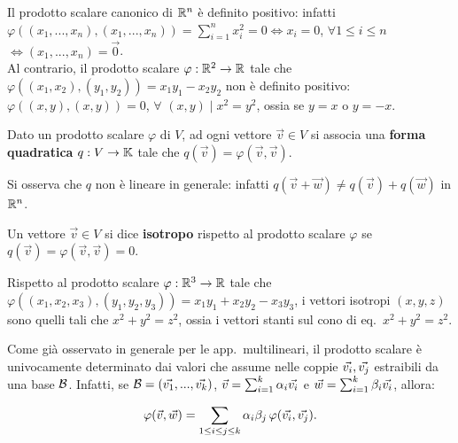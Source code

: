 \begin{example}
	Il prodotto scalare canonico di $\mathbb R^n$ è definito positivo: infatti $\varphi((x_1, ..., x_n), (x_1, ..., x_n)) =
	\sum_{i=1}^n x_i^2  = 0 \iff x_i = 0$, $\forall 1 \leq i \leq n$ $\iff (x_1, ..., x_n) = \vec{0}$. \\
	
	Al contrario, il prodotto scalare $\varphi : \mathbb R^2 \to \mathbb R$ tale che $\varphi((x_1, x_2), (y_1, y_2)) = x_1 y_1 - x_2 y_2$ non è definito positivo: $\varphi((x, y), (x, y)) = 0$, $\forall$ $(x, y) \mid x^2 = y^2$, ossia se
	$y = x$ o $y = -x$.
\end{example}

\begin{definition}
	Dato un prodotto scalare $\varphi$ di $V$, ad ogni vettore $\vec{v} \in V$ si associa una \textbf{forma quadratica}
	$q : V \to \mathbb{K}$ tale che $q(\vec{v}) = \varphi(\vec{v}, \vec{v})$.
\end{definition}

\begin{remark}
	Si osserva che $q$ non è lineare in generale: infatti $q(\vec{v} + \vec{w}) \neq q(\vec{v}) + q(\vec{w})$ in
	$\mathbb R^n$.
\end{remark}

\begin{definition}
	Un vettore $\vec{v} \in V$ si dice \textbf{isotropo} rispetto al prodotto scalare $\varphi$ se $q(\vec{v}) =
	\varphi(\vec{v}, \vec{v}) = 0$.
\end{definition}

\begin{example}
	Rispetto al prodotto scalare $\varphi : \mathbb R^3 \to \mathbb R$ tale che $\varphi((x_1, x_2, x_3), (y_1, y_2, y_3)) =
	x_1 y_1 + x_2 y_2 - x_3 y_3$, i vettori isotropi $(x, y, z)$ sono quelli tali che $x^2 + y^2 = z^2$, ossia
	i vettori stanti sul cono di eq.~$x^2 + y^2 = z^2$.
\end{example}

\begin{remark}
	Come già osservato in generale per le app.~multilineari, il prodotto scalare è univocamente determinato
	dai valori che assume nelle coppie $\vv{i}, \vv{j}$ estraibili da una base $\mathcal{B}$. Infatti, se
	$\basis = (\vv1, ..., \vv{k})$, $\vec{v} = \sum_{i=1}^k \alpha_i \vv{i}$ e $\vec{w} = \sum_{i=1}^k \beta_i \vv{i}$,
	allora:
	
	\[ \varphi(\vec{v}, \vec{w}) = \sum_{1 \leq i \leq j \leq k} \alpha_i \beta_j \, \varphi(\vv{i}, \vv{j}). \]
\end{remark}

